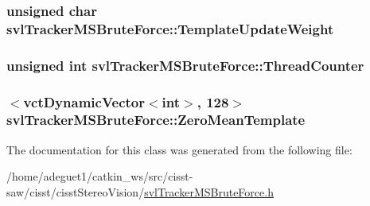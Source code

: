 \hypertarget{classsvl_tracker_m_s_brute_force_ab88fcbddc49c7020a7e86693ddd68c51}{
\subsubsection[{Template\-Update\-Weight}]{\setlength{\rightskip}{0pt plus 5cm}unsigned char svl\-Tracker\-M\-S\-Brute\-Force\-::\-Template\-Update\-Weight\hspace{0.3cm}{\ttfamily [protected]}}}\label{classsvl_tracker_m_s_brute_force_ab88fcbddc49c7020a7e86693ddd68c51}
\hypertarget{classsvl_tracker_m_s_brute_force_ac89d9f21981711ec7c4b08e57f66ef99}{
\subsubsection[{Thread\-Counter}]{\setlength{\rightskip}{0pt plus 5cm}unsigned int svl\-Tracker\-M\-S\-Brute\-Force\-::\-Thread\-Counter\hspace{0.3cm}{\ttfamily [protected]}}}\label{classsvl_tracker_m_s_brute_force_ac89d9f21981711ec7c4b08e57f66ef99}
\hypertarget{classsvl_tracker_m_s_brute_force_abc0f2604ffefdaeb0cca4d5653edf099}{
\subsubsection[{Zero\-Mean\-Template}]{$<${\bf vct\-Dynamic\-Vector}$<$int$>$, 128$>$ svl\-Tracker\-M\-S\-Brute\-Force\-::\-Zero\-Mean\-Template\hspace{0.3cm}{\ttfamily [protected]}}}\label{classsvl_tracker_m_s_brute_force_abc0f2604ffefdaeb0cca4d5653edf099}


The documentation for this class was generated from the following file\-:\begin{DoxyCompactItemize}
\item 
/home/adeguet1/catkin\-\_\-ws/src/cisst-\/saw/cisst/cisst\-Stereo\-Vision/\hyperlink{svl_tracker_m_s_brute_force_8h}{svl\-Tracker\-M\-S\-Brute\-Force.\-h}\end{DoxyCompactItemize}
